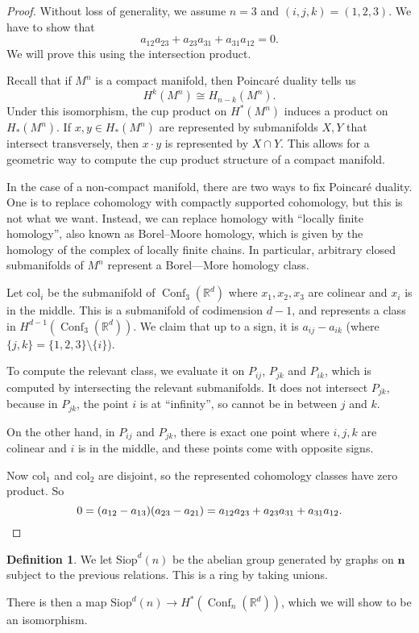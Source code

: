 \documentclass{shortart}
\theoremstyle{definition}
\newtheorem{defi}[thm]{Definition}
\DeclareMathOperator\Conf{Conf}
\newcommand\R{\mathbb{R}}
\newcommand\Siop{\mathrm{Siop}}
\newcommand\col{\mathrm{col}}
\begin{document}
\begin{proof}
  Without loss of generality, we assume $n = 3$ and $(i, j, k) = (1, 2, 3)$. We have to show that
  \[
    a_{12} a_{23} + a_{23} a_{31} + a_{31} a_{12} = 0.
  \]
  We will prove this using the intersection product.

  Recall that if $M^n$ is a compact manifold, then Poincar\'e duality tells us
  \[
    H^k(M^n) \cong H_{n - k}(M^n).
  \]
  Under this isomorphism, the cup product on $H^*(M^n)$ induces a product on $H_*(M^n)$. If $x, y \in H_*(M^n)$ are represented by submanifolds $X, Y$ that intersect transversely, then $x \cdot y$ is represented by $X \cap Y$. This allows for a geometric way to compute the cup product structure of a compact manifold.

  In the case of a non-compact manifold, there are two ways to fix Poincar\'e duality. One is to replace cohomology with compactly supported cohomology, but this is not what we want. Instead, we can replace homology with ``locally finite homology'', also known as Borel--Moore homology, which is given by the homology of the complex of locally finite chains. In particular, arbitrary closed submanifolds of $M^n$ represent a Borel---More homology class.

  Let $\col_i$ be the submanifold of $\Conf_3(\R^d)$ where $x_1, x_2, x_3$ are colinear and $x_i$ is in the middle. This is a submanifold of codimension $d - 1$, and represents a class in $H^{d - 1}(\Conf_3(\R^d))$. We claim that up to a sign, it is $a_{ij} - a_{ik}$ (where $\{j, k\} = \{1, 2, 3\} \setminus \{i\}$).

  To compute the relevant class, we evaluate it on $P_{ij}$, $P_{jk}$ and $P_{ik}$, which is computed by intersecting the relevant submanifolds. It does not intersect $P_{jk}$, because in $P_{jk}$, the point $i$ is at ``infinity'', so cannot be in between $j$ and $k$.

  On the other hand, in $P_{ij}$ and $P_{jk}$, there is exact one point where $i, j, k$ are colinear and $i$ is in the middle, and these points come with opposite signs.

  Now $\col_1$ and $\col_2$ are disjoint, so the represented cohomology classes have zero product. So
  \[
    0 = (a_{12} - a_{13})(a_{23} - a_{21}) = a_{12} a_{23} + a_{23} a_{31} + a_{31} a_{12}.\qedhere
  \]
\end{proof}

\begin{defi}
  We let $\Siop^d(n)$ be the abelian group generated by graphs on $\mathbf{n}$ subject to the previous relations. This is a ring by taking unions.
\end{defi}
There is then a map $\Siop^d(n) \to H^*(\Conf_n(\R^d))$, which we will show to be an isomorphism.
\end{document}
